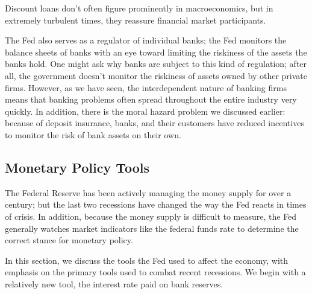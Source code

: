 \documentclass[11pt]{article} %
\begin{document}
Discount loans don't often figure prominently in macroeconomics, but in extremely turbulent times, they reassure financial market participants.

The Fed also serves as a regulator of individual banks; the Fed monitors the balance sheets of banks with an eye toward limiting the riskiness of the assets the banks hold. One might ask why banks are subject to this kind of regulation; after all, the government doesn't monitor the riskiness of assets owned by other private firms. However, as we have seen, the interdependent nature of banking firms means that banking problems often spread throughout the entire industry very quickly. In addition, there is the moral hazard problem we discussed earlier: because of deposit insurance, banks, and their customers have reduced incentives to monitor the risk of bank assets on their own.

\subsection*{Monetary Policy Tools}
The Federal Reserve has been actively managing the money supply for over a century; but the last two recessions have changed the way the Fed reacts in times of crisis. In addition, because the money supply is difficult to measure, the Fed generally watches market indicators like the federal funds rate to determine the correct stance for monetary policy.

In this section, we discuss the tools the Fed used to affect the economy, with emphasis on the primary tools used to combat recent recessions. We begin with a relatively new tool, the interest rate paid on bank reserves.
\end{document}
